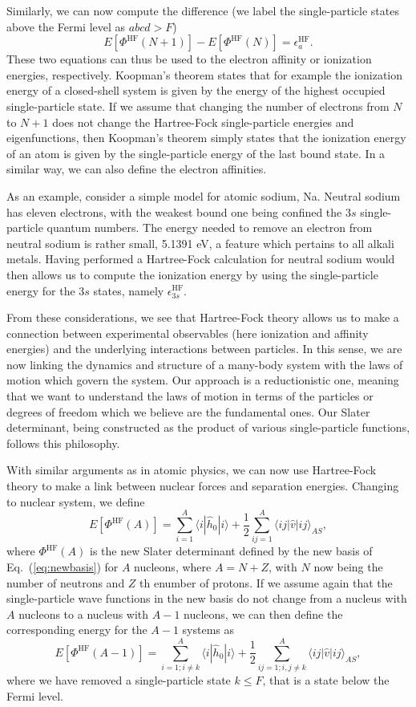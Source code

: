 \documentclass[graybox,sectrefs,envcountresetchap,open=right]{svmonodo}
\begin{document}
Similarly, we can now compute the difference (we label the single-particle states above the Fermi level as $abcd > F$)
\[
  E[\Phi^{\mathrm{HF}}(N+1)]-   E[\Phi^{\mathrm{HF}}(N)]= \epsilon_a^{\mathrm{HF}}. 
\]
These two equations can thus be used to the electron affinity or ionization energies, respectively. 
Koopman's theorem states that for example the ionization energy of a closed-shell system is given by the energy of the highest occupied single-particle state.  If we assume that changing the number of electrons from $N$ to $N+1$ does not change the Hartree-Fock single-particle energies and eigenfunctions, then Koopman's theorem simply states that the ionization energy of an atom is given by the single-particle energy of the last bound state. In a similar way, we can also define the electron affinities. 



As an example, consider a simple model for atomic sodium, Na. Neutral sodium has eleven electrons, 
with the weakest bound one being confined the $3s$ single-particle quantum numbers. The energy needed to remove an electron from neutral sodium is rather small, 5.1391 eV, a feature which pertains to all alkali metals.
Having performed a  Hartree-Fock calculation for neutral sodium would then allows us to compute the
ionization energy by using the single-particle energy for the $3s$ states, namely $\epsilon_{3s}^{\mathrm{HF}}$. 

From these considerations, we see that Hartree-Fock theory allows us to make a connection between experimental 
observables (here ionization and affinity energies) and the underlying interactions between particles.  
In this sense, we are now linking the dynamics and structure of a many-body system with the laws of motion which govern the system. Our approach is a reductionistic one, meaning that we want to understand the laws of motion 
in terms of the particles or degrees of freedom which we believe are the fundamental ones. Our Slater determinant, being constructed as the product of various single-particle functions, follows this philosophy.


With similar arguments as in atomic physics, we can now use Hartree-Fock theory to make a link
between nuclear forces and separation energies. Changing to nuclear system, we define
\[
  E[\Phi^{\mathrm{HF}}(A)] 
  = \sum_{i=1}^A \langle i | \hat{h}_0 | i \rangle +
  \frac{1}{2}\sum_{ij=1}^A\langle ij|\hat{v}|ij\rangle_{AS},
\]
where $\Phi^{\mathrm{HF}}(A)$ is the new Slater determinant defined by the new basis of Eq.~(\ref{eq:newbasis})
for $A$ nucleons, where $A=N+Z$, with $N$ now being the number of neutrons and $Z$ th enumber of protons.  If we assume again that the single-particle wave functions in the new basis do not change from a nucleus with $A$ nucleons to a nucleus with $A-1$  nucleons, we can then define the corresponding energy for the $A-1$ systems as 
\[
  E[\Phi^{\mathrm{HF}}(A-1)] 
  = \sum_{i=1; i\ne k}^A \langle i | \hat{h}_0 | i \rangle +
  \frac{1}{2}\sum_{ij=1;i,j\ne k}^A\langle ij|\hat{v}|ij\rangle_{AS},
\]
where we have removed a single-particle state $k\le F$, that is a state below the Fermi level.  
\end{document}
